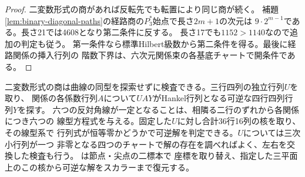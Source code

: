 \begin{proof}
二変数形式の商があれば反転先でも転置により同じ商が続く。
補題\ref{lem:binary-diagonal-paths}の経路商の$P_3^*$始点で長さ$2m+1$の次元は
$9\cdot2^{m-1}$である。長さ21では4608となり第二条件に反する。
長さ17でも$1152>1140$なので追加の判定も従う。
第一条件なら標準Hilbert級数から第二条件を得る。最後に経路関係の挿入行列の
階数下界は、六次元関係束の各基底チャートで開条件である。
\end{proof}

二変数形式の商は曲線の同型を探索せずに検査できる。三行四列の独立行列$U$を取り、
関係の各係数行列$A$について$UAY$がHankel行列となる可逆な四行四列行列$Y$を探す。
六つの反対角線が一定となることは、相隣る二行のずれから各関係につき六つの
線型方程式を与える。固定した$U$に対し合計36行16列の核を取り、その線型系で
行列式が恒等零かどうかで可逆解を判定できる。$U$については三次小行列が一つ
非零となる四つのチャートで解の存在を調べればよく、左右を交換した検査も行う。
は節点・尖点の二標本で
座標を取り替え、指定した三平面上のこの核から可逆な解をスカラーまで復元する。
